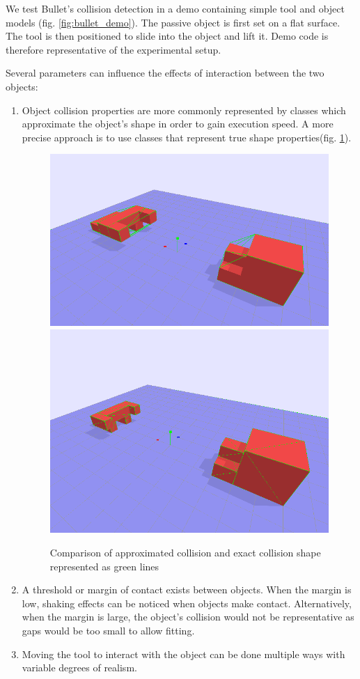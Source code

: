 \documentclass[11]{article}
\begin{document}
We test Bullet's collision detection in a demo containing simple tool and object models (fig. \ref{fig:bullet_demo}).
The passive object is first set on a flat surface.
The tool is then positioned to slide into the object and lift it.
Demo code is therefore representative of the experimental setup.  

Several parameters can influence the effects of interaction between the two objects:
\begin{enumerate}
\item Object collision properties are more commonly represented by classes which approximate the object's shape in order to gain execution speed.
A more precise approach is to use classes that represent true shape properties(fig. \ref{fig:collision_shape}).   

\begin{figure}[h]
\centering
\includegraphics[width=.48\textwidth]{figures/collision_approximation.png}
\includegraphics[width=.41\textwidth]{figures/collision_exact.png}
\caption{Comparison of approximated collision and exact collision shape represented as green lines}
\label{fig:collision_shape}
\end{figure}      

\item A threshold or margin of contact exists between objects. 
When the margin is low, shaking effects can be noticed when objects make contact. 
Alternatively, when the margin is large, the object's collision would not be representative as gaps would be too small to allow fitting. 

\item Moving the tool to interact with the object can be done multiple ways with variable degrees of realism.
\end{enumerate}
\end{document}
